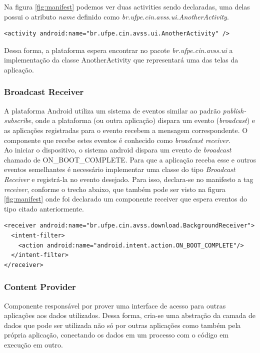 \documentclass[a4paper,12pt]{article}
\numberwithin{figure}{section}
\begin{document}
Na figura \ref{fig:manifest} podemos ver duas activities sendo declaradas, uma delas possui o atributo \textit{name} definido como \textit{br.ufpe.cin.avss.ui.AnotherActivity}.
{\fontsize{9pt}{12pt}
\begin{Verbatim}
<activity android:name="br.ufpe.cin.avss.ui.AnotherActivity" />
\end{Verbatim}
}

Dessa forma, a plataforma espera encontrar no pacote \textit{br.ufpe.cin.avss.ui} a implementação da classe AnotherActivity que representará uma das telas da aplicação.

\subsubsection{Broadcast Receiver}

A plataforma Android utiliza um sistema de eventos similar ao padrão \textit{publish-subscribe}, onde a plataforma (ou outra aplicação) dispara um evento (\textit{broadcast}) e as aplicações registradas para o evento recebem a mensagem correspondente. O componente que recebe estes eventos é conhecido como \textit{broadcast receiver}.\\
Ao iniciar o dispositivo, o sistema android dispara um evento de \textit{broadcast} chamado de ON\_BOOT\_COMPLETE. Para que a aplicação receba esse e outros eventos semelhantes é necessário implementar uma classe do tipo \textit{Broadcast Receiver} e registrá-la no evento desejado. Para isso, declara-se no manifesto a tag \textit{receiver}, conforme o trecho abaixo, que também pode ser visto na figura \ref{fig:manifest} onde foi declarado um componente receiver que espera eventos do tipo citado anteriormente.
{\fontsize{9pt}{12pt}
\begin{verbatim}
<receiver android:name="br.ufpe.cin.avss.download.BackgroundReceiver">
  <intent-filter>
    <action android:name="android.intent.action.ON_BOOT_COMPLETE"/>
  </intent-filter>
</receiver>
\end{verbatim}
}

\subsubsection{Content Provider}
\label{sec:provider}
Componente responsável por prover uma interface de acesso para outras aplicações aos dados utilizados. Dessa forma, cria-se uma abstração da camada de dados que pode ser utilizada não só por outras aplicações como também pela própria aplicação, conectando os dados em um processo com o código em execução em outro.\\
\end{document}
